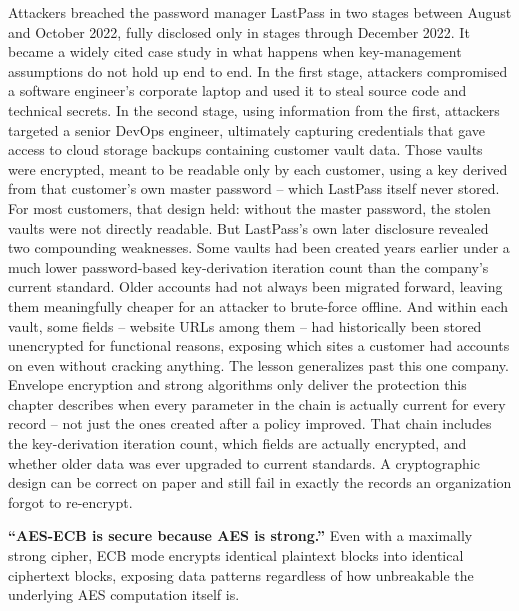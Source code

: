 \begin{example}
Attackers breached the password manager LastPass in two stages between August and October 2022,
fully disclosed only in stages through December 2022. It became a widely cited case study in what
happens when key-management assumptions do not hold up end to end. In the first stage,
attackers compromised a software engineer's corporate laptop and used it to steal source code and
technical secrets. In the second stage, using information from the first, attackers targeted a
senior DevOps engineer, ultimately capturing credentials that gave access to cloud storage backups
containing customer vault data. Those vaults were encrypted, meant to be readable only by each
customer, using a key derived from that customer's own master password -- which LastPass itself
never stored. For most customers, that design held: without the master password, the stolen vaults
were not directly readable. But LastPass's own later disclosure revealed two compounding
weaknesses. Some vaults had been created years earlier under a much lower password-based
key-derivation iteration count than the company's current standard. Older accounts had not always
been migrated forward, leaving them meaningfully cheaper for an attacker to brute-force offline.
And within each vault, some fields -- website URLs among them -- had historically been stored
unencrypted for functional reasons, exposing which sites a customer had accounts on even without
cracking anything. The lesson generalizes past this one company. Envelope encryption and strong
algorithms only deliver the protection this chapter describes when every parameter in the chain is
actually current for every record -- not just the ones created after a policy improved. That chain
includes the key-derivation iteration count, which fields are actually encrypted, and whether older
data was ever upgraded to current standards. A cryptographic design can be correct on paper and
still fail in exactly the records an organization forgot to re-encrypt.
\end{example}

\begin{misconception}
\textbf{``AES-ECB is secure because AES is strong.''} Even with a maximally strong cipher, ECB
mode encrypts identical plaintext blocks into identical ciphertext blocks, exposing data patterns
regardless of how unbreakable the underlying AES computation itself is.
\end{misconception}

